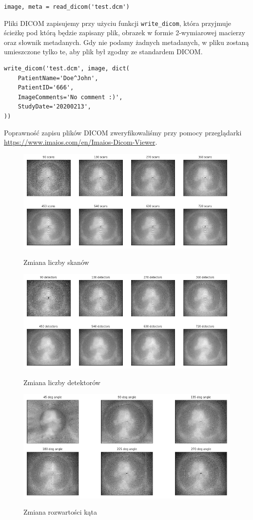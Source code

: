\documentclass[11pt]{article}
\def\code#1{\texttt{#1}}
\begin{document}
\begin{verbatim}
image, meta = read_dicom('test.dcm')
\end{verbatim}

Pliki DICOM zapisujemy przy użyciu funkcji \code{write\_dicom}, która przyjmuje ścieżkę pod którą będzie zapisany plik, obrazek w formie 2-wymiarowej macierzy oraz słownik metadanych.
Gdy nie podamy żadnych metadanych, w pliku zostaną umieszczone tylko te, aby plik był zgodny ze standardem DICOM.

\begin{verbatim}
write_dicom('test.dcm', image, dict(
    PatientName='Doe^John',
    PatientID='666',
    ImageComments='No comment :)',
    StudyDate='20200213',
))
\end{verbatim}

Poprawność zapisu plików DICOM zweryfikowaliśmy przy pomocy przeglądarki 
\url{https://www.imaios.com/en/Imaios-Dicom-Viewer}.


\newpage

\begin{figure}[h]
	\includegraphics[width=\linewidth]{res/scans.png}
	\label{fig:scans}
	\caption{Zmiana liczby skanów}
\end{figure}

\begin{figure}[h]
	\includegraphics[width=\linewidth]{res/detec.png}
	\label{fig:detec}
	\caption{Zmiana liczby detektorów}
\end{figure}

\begin{figure}[h]
	\includegraphics[width=\linewidth]{res/angle.png}
	\label{fig:angle}
	\caption{Zmiana rozwartości kąta}
\end{figure}
\end{document}
